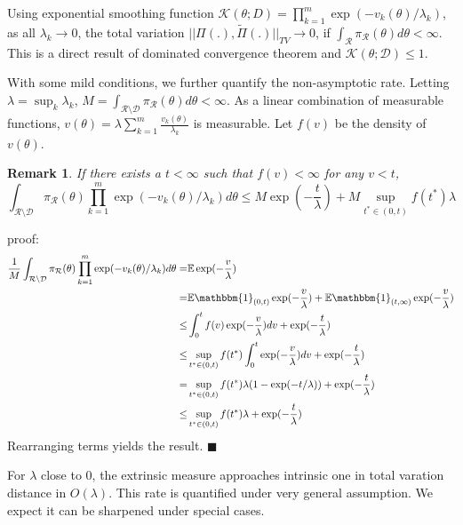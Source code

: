 \documentclass[10pt]{article}
\newtheorem{remark}{Remark}
\newcommand{\mc}[1]{\mathcal{#1}}
\DeclareMathOperator{\1}{\mathbbm{1}}
\begin{document}
Using exponential smoothing function $\mc K(\theta; D) = \prod_{k=1}^m \exp( -v_k(\theta)/\lambda_k)$, as all $\lambda_k \rightarrow 0$, the total variation $||\Pi(.), \tilde{\Pi}(.) ||_{TV} \rightarrow 0$, if $\int_{\mc R} \pi_{\mc R}(\theta) d\theta<\infty$. This is a direct result of dominated convergence theorem and $\mc K(\theta; \mc D)\le 1$.


With some mild conditions, we further quantify the non-asymptotic rate. Letting $\lambda = \sup_k \lambda_k$, $M= \int_{\mc R \setminus \mc D} \pi_{\mc R}(\theta) d\theta<\infty$. As a linear combination of measurable functions, $v(\theta)=\lambda\sum_{k=1}^m\frac{ v_k(\theta)}{\lambda_k}$ is measurable. Let $f(v)$ be the density of $v(\theta)$.

\begin{remark}
\label{convergence_rate}
If there exists a $t<\infty$ such that $f(v) < \infty$ for any $v<t$,
$$\int_{\mc R \setminus \mc D} {\pi_{\mc R}(\theta)} \prod_{k=1}^m \exp( -v_k(\theta)/\lambda_k) d \theta \le 
 {M} \exp(-\frac{t}{\lambda}) + {M} \sup_{t^*\in(0,t)} {f(t^*)}\lambda 
$$
\end{remark}
proof:
\begin{equation}
\begin{aligned}
\frac{1}{M}\int_{\mc R \setminus \mc D} {\pi_{\mc R}(\theta)} \prod_{k=1}^m \exp( -v_k(\theta)/\lambda_k) d \theta = & 
\mathbb{E} \exp(- \frac{v}{\lambda}) \\
= & \mathbb{E} \mathbbm{1}_{(0,t)} \exp(- \frac{v}{\lambda}) +  \mathbb{E} \mathbbm{1}_{(t,\infty)} \exp(- \frac{v}{\lambda}) \\
\le & \int_0^t f(v) \exp(- \frac{v}{\lambda}) dv + \exp(-\frac{t}{\lambda}) \\
\le & \sup_{t^*\in(0,t)} f(t^*) \int_0^t \exp(- \frac{v}{\lambda}) dv + \exp(-\frac{t}{\lambda}) \\
= & \sup_{t^*\in(0,t)} f(t^*)  \lambda (1- \exp(-t/\lambda)) + \exp(-\frac{t}{\lambda}) \\
\le  & \sup_{t^*\in(0,t)} f(t^*)  \lambda  + \exp(-\frac{t}{\lambda}) \\
\end{aligned}
\end{equation}
Rearranging terms yields the result.  $\blacksquare$

For $\lambda$ close to $0$, the extrinsic measure approaches intrinsic one in total varation distance in $O(\lambda)$. This rate is quantified under very general assumption. We expect it can be sharpened under special cases.
\end{document}
